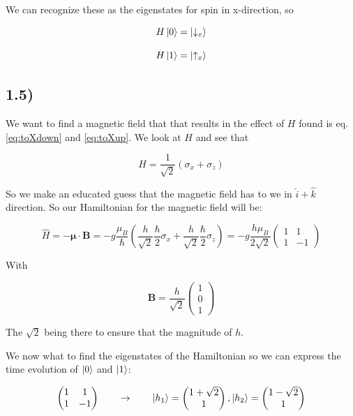\documentclass[a4paper,norsk, 10pt]{article}
\begin{document}
We can recognize these as the eigenstates for spin in x-direction, so

\begin{equation}
H\ket{0} = \ket{\downarrow_x}
\end{equation}\label{eq:toXdown}

\begin{equation}
H\ket{1} = \ket{\uparrow_x}
\end{equation}\label{eq:toXup}


\subsection{1.5)}
We want to find a magnetic field that that results in the effect of $H$ found is eq. \eqref{eq:toXdown} and \eqref{eq:toXup}. We look at $H$ and see that

\begin{equation}
H = \frac{1}{\sqrt{2}}\left(\sigma_x + \sigma_z\right)
\end{equation}

So we make an educated guess that the magnetic field has to we in $\hat{i} + \hat{k}$ direction. So our Hamiltonian for the magnetic field will be:

\begin{equation}
\hat{H} = -\mathbf{\mu}\cdot \mathbf{B} = - g\frac{\mu_B}{\hbar}\left(\frac{h}{\sqrt{2}}\frac{\hbar}{2}\sigma_x + \frac{h}{\sqrt{2}}\frac{\hbar}{2}\sigma_z\right) = -g\frac{h\mu_B}{2\sqrt{2}}
\begin{pmatrix}
1 & 1 \\
1 & -1
\end{pmatrix}
\end{equation}

With

\begin{equation}
\mathbf{B} = \frac{h}{\sqrt{2}}
\begin{pmatrix}
1 \\ 0 \\ 1
\end{pmatrix}
\end{equation}

The $\sqrt{2}$ being there to ensure that the magnitude of $h$. 

We now what to find the eigenstates of the Hamiltonian so we can express the time evolution of $\ket{0}$ and $\ket{1}$:

\begin{equation}
\begin{pmatrix}
1 & 1 \\
1 & -1
\end{pmatrix}
\qquad
\rightarrow
\qquad
\ket{h_1} = 
\begin{pmatrix}
1 + \sqrt{2} \\ 1
\end{pmatrix},
\ket{h_2} = 
\begin{pmatrix}
1 - \sqrt{2} \\ 1
\end{pmatrix}
\end{equation}
\end{document}
